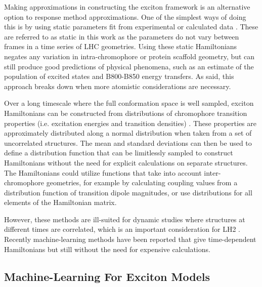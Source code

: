 Making approximations in constructing the exciton framework is an alternative option
to response method approximations. One of the simplest ways of doing this is by 
using static parameters fit from experimental or calculated data \cite{Cory1998, Hu1997, Tretiak2000}. 
These are referred to as static in this work as the parameters do not vary between 
frames in a time series of LHC geometries. Using these static Hamiltonians negates
any variation in intra-chromophore or protein scaffold geometry, but can still produce
good predictions of physical phenomena, such as an estimate of the population of
excited states \cite{Cory1998, Hu1997} and B800-B850 energy transfers. As said, 
this approach breaks down when more atomistic considerations are necessary.

Over a long timescale where the full conformation space is well sampled, exciton
Hamiltonians can be constructed from distributions of chromophore transition properties
(i.e. excitation energies and transition densities) \cite{Stross2016}. These properties
are approximately distributed along a normal distribution when taken from a set 
of uncorrelated structures. The mean and standard deviations can then be used to 
define a distribution function that can be limitlessly sampled to construct Hamiltonians
without the need for explicit calculations on separate structures. The Hamiltonians
could utilize functions that take into account inter-chromophore geometries, for
example by calculating coupling values from a distribution function of transition
dipole magnitudes, or use distributions for all elements of the Hamiltonian matrix.

However, these methods are ill-suited for dynamic studies where structures at different
times are correlated, which is an important consideration for LH2 \cite{Papiz2003}.
Recently machine-learning methods have been reported that give time-dependent Hamiltonians
but still without the need for expensive calculations.

\subsection{Machine-Learning For Exciton Models}
\label{subsec:machine_learning} 

